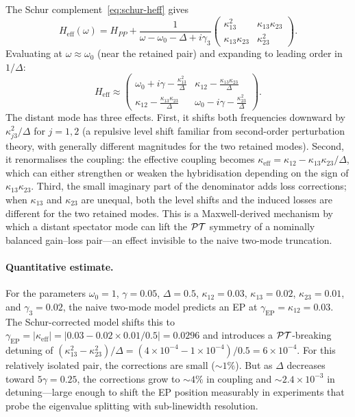 The Schur complement~\eqref{eq:schur-heff} gives
\begin{equation}
 H_{\mathrm{eff}}(\omega) = H_{PP}
 + \frac{1}{\omega - \omega_0 - \Delta + i\gamma_3}
 \begin{pmatrix}
   \kappa_{13}^2 & \kappa_{13}\kappa_{23} \\
   \kappa_{13}\kappa_{23} & \kappa_{23}^2
 \end{pmatrix}.
 \label{eq:three-mode-schur}
\end{equation}
Evaluating at $\omega \approx \omega_0$ (near the retained pair) and
expanding to leading order in $1/\Delta$:
\begin{equation}
 H_{\mathrm{eff}} \approx
 \begin{pmatrix}
   \omega_0 + i\gamma - \frac{\kappa_{13}^2}{\Delta} &
   \kappa_{12} - \frac{\kappa_{13}\kappa_{23}}{\Delta} \\[6pt]
   \kappa_{12} - \frac{\kappa_{13}\kappa_{23}}{\Delta} &
   \omega_0 - i\gamma - \frac{\kappa_{23}^2}{\Delta}
 \end{pmatrix}.
 \label{eq:three-mode-effective}
\end{equation}
The distant mode has three effects.  First, it shifts both frequencies
downward by $\kappa_{j3}^2/\Delta$ for $j = 1,2$ (a repulsive level
shift familiar from second-order perturbation theory, with generally
different magnitudes for the two retained modes).  Second, it renormalises the
coupling: the effective coupling becomes
$\kappa_{\mathrm{eff}} = \kappa_{12} - \kappa_{13}\kappa_{23}/\Delta$,
which can either strengthen or weaken the hybridisation depending on
the sign of $\kappa_{13}\kappa_{23}$. Third, the small imaginary part of
the denominator adds loss corrections; when $\kappa_{13}$ and
$\kappa_{23}$ are unequal, both the level shifts and the induced losses
are different for the two retained modes. This is a Maxwell-derived
mechanism by which a distant spectator mode can lift the $\mathcal{PT}$ symmetry
of a nominally balanced gain--loss pair---an effect invisible to the
naive two-mode truncation.

\paragraph{Quantitative estimate.}
For the parameters $\omega_0 = 1$, $\gamma = 0.05$, $\Delta = 0.5$,
$\kappa_{12} = 0.03$, $\kappa_{13} = 0.02$, $\kappa_{23} = 0.01$,
and $\gamma_3 = 0.02$, the naive two-mode model predicts an EP at
$\gamma_{\mathrm{EP}} = \kappa_{12} = 0.03$. The Schur-corrected
model shifts this to
$\gamma_{\mathrm{EP}} = |\kappa_{\mathrm{eff}}| = |0.03 - 0.02 \times 0.01/0.5| = 0.0296$
and introduces a $\mathcal{PT}$-breaking detuning of
$(\kappa_{13}^2 - \kappa_{23}^2)/\Delta = (4 \times 10^{-4} - 1 \times 10^{-4})/0.5 = 6 \times 10^{-4}$.
For this relatively isolated pair, the corrections are small
($\sim 1\%$). But as $\Delta$ decreases toward $5\gamma = 0.25$, the
corrections grow to $\sim 4\%$ in coupling and $\sim 2.4 \times 10^{-3}$
in detuning---large enough to shift the EP position measurably in
experiments that probe the eigenvalue splitting with sub-linewidth
resolution.

